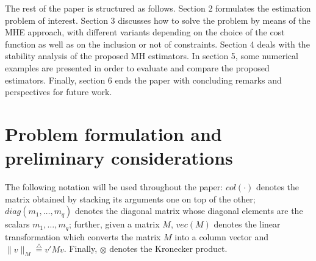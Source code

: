 \documentclass[11pt,journal,onecolumn]{IEEEtran}
\newcommand{\defi} { \stackrel{\bigtriangleup}{=} }
\begin{document}
The rest of the paper is structured as follows. Section 2 formulates the estimation problem of interest. Section 3 discusses how to solve the problem by means of the MHE approach, with different variants depending on the choice of the cost function as well as on the inclusion or not of constraints. Section 4 deals with the stability analysis of the proposed MH estimators. In section 5, some numerical examples are presented in order to evaluate and compare the proposed estimators. Finally, section 6 ends the paper with concluding remarks and perspectives for future work.

\section{Problem formulation and preliminary considerations}

The following notation will be used throughout the paper: $col(\cdot)$ denotes the matrix obtained by stacking its arguments one on top of the other; $diag(m_{1},\ldots,m_{q})$ denotes the diagonal matrix whose diagonal elements are the scalars $m_{1},\ldots,m_{q}$; further, given a matrix $M$, $vec(M)$ denotes the linear transformation which converts the matrix $M$ into a column vector and
$\|v\|_{M} \defi v' M v$. Finally, $\otimes$ denotes the Kronecker product.
\end{document}
